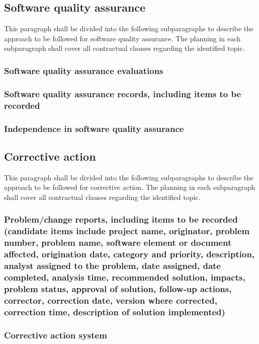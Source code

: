 \subsection{Software quality assurance}

This paragraph shall be divided into the following subparagraphs to
describe the approach to be followed for software quality assurance. The
planning in each subparagraph shall cover all contractual clauses
regarding the identified topic.

\subsubsection{Software quality assurance evaluations}

\subsubsection{Software quality assurance records, including items to
be recorded}

\subsubsection{Independence in software quality assurance}

\subsection{Corrective action}

This paragraph shall be divided into the following subparagraphs to
describe the approach to be followed for corrective action. The planning
in each subparagraph shall cover all contractual clauses regarding the
identified topic.

\subsubsection{Problem/change reports, including items to
be recorded (candidate items include project name, originator, problem
number, problem name, software element or document affected, origination
date, category and priority, description, analyst assigned to the
problem, date assigned, date completed, analysis time, recommended
solution, impacts, problem status, approval of solution, follow-up
actions, corrector, correction date, version where corrected, correction
time, description of solution implemented)}

\subsubsection{Corrective action system}

